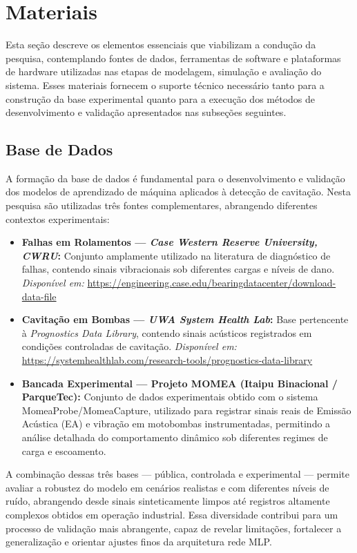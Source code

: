 \section{Materiais}
Esta seção descreve os elementos essenciais que viabilizam a condução da pesquisa, contemplando fontes de dados, ferramentas de software e plataformas de hardware utilizadas nas etapas de modelagem, simulação e avaliação do sistema. Esses materiais fornecem o suporte técnico necessário tanto para a construção da base experimental quanto para a execução dos métodos de desenvolvimento e validação apresentados nas subseções seguintes.
\subsection{Base de Dados}

A formação da base de dados é fundamental para o desenvolvimento e validação dos modelos de aprendizado de máquina aplicados à detecção de cavitação. Nesta pesquisa são utilizadas três fontes complementares, abrangendo diferentes contextos experimentais:

\begin{itemize}
	\item \textbf{Falhas em Rolamentos — \textit{Case Western Reserve University, CWRU}:}  
	Conjunto amplamente utilizado na literatura de diagnóstico de falhas, contendo sinais vibracionais sob diferentes cargas e níveis de dano.  
	\textit{Disponível em:} \url{https://engineering.case.edu/bearingdatacenter/download-data-file}
	
	\item \textbf{Cavitação em Bombas —\textit{ UWA System Health Lab}:}  
	Base pertencente à \textit{Prognostics Data Library}, contendo sinais acústicos registrados em condições controladas de cavitação.  
	\textit{Disponível em:} \url{https://systemhealthlab.com/research-tools/prognostics-data-library}
	
	\item \textbf{Bancada Experimental — Projeto MOMEA (Itaipu Binacional / ParqueTec):}
	Conjunto de dados experimentais obtido com o sistema MomeaProbe/MomeaCapture, utilizado para registrar sinais reais de Emissão Acústica (EA) e vibração em motobombas instrumentadas, permitindo a análise detalhada do comportamento dinâmico sob diferentes regimes de carga e escoamento.	
\end{itemize}

A combinação dessas três bases — pública, controlada e experimental — permite avaliar a robustez do modelo em cenários realistas e com diferentes níveis de ruído, abrangendo desde sinais sinteticamente limpos até registros altamente complexos obtidos em operação industrial. Essa diversidade contribui para um processo de validação mais abrangente, capaz de revelar limitações, fortalecer a generalização e orientar ajustes finos da arquitetura rede MLP.


